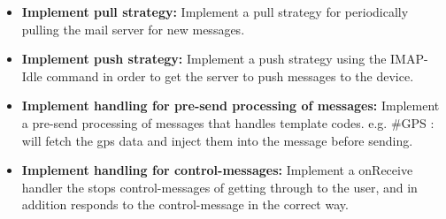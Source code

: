 \begin{itemize}
\begin{itemize}
\item{}\textbf{Implement pull strategy:} Implement a pull strategy for periodically pulling the mail server for new messages.
\item{}\textbf{Implement push strategy:} Implement a push strategy using the IMAP-Idle command in order to get the server to push messages to the device. 
\item{}\textbf{Implement handling for pre-send processing of messages:} Implement a pre-send processing of messages that handles template codes. e.g. \#GPS : will fetch the gps data and inject them into the message before sending. 
\item{}\textbf{Implement handling for control-messages:} Implement a onReceive handler the stops control-messages of getting through to the user, and in addition responds to the control-message in the correct way.
\end{itemize}

\newpage


\end{itemize}
